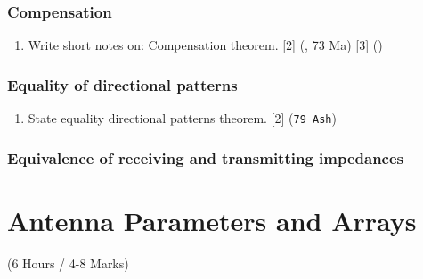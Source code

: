 \documentclass[12pt]{article}
\begin{document}
    \subsubsection{Compensation}
      \begin{enumerate}
        \item Write short notes on: Compensation theorem. \hfill [2] (, 73 Ma) [3] ()
      \end{enumerate}

    \subsubsection{Equality of directional patterns}
      \begin{enumerate}
        \item State equality directional patterns theorem. \hfill [2] (\texttt{79 Ash})
      \end{enumerate}
    \subsubsection{Equivalence of receiving and transmitting impedances}

\pagebreak

\section{Antenna Parameters and Arrays}
  \begin{center} (6 Hours / 4-8 Marks) \end{center}
\end{document}
